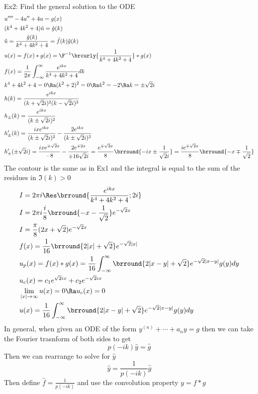 Ex2: Find the general solution to the ODE
\begin{align*}
    &u''''-4u''+4u=g(x)\\
    &(k^4+4k^2+4)\hat{u}=\hat{g}(k)\\
    &\hat{u}=\frac{\hat{g}(k)}{k^4+4k^2+4}=\hat{f}(k)\hat{g}(k)\\
    &u(x)=f(x)*g(x)=\F^{-1}\brcurly{\frac{1}{k^4+4k^2+4}}*g(x)\\
    &f(x)=\frac{1}{2\pi}\int_{-\infty}^\infty\frac{e^{ikx}}{k^4+4k^2+4}dk\\
    &k^4+4k^2+4=0\Ra (k^2+2)^2=0\Ra k^2=-2\Ra k=\pm \sqrt{2}i\\
    &h(k)=\frac{e^{ikx}}{(k+\sqrt{2}i)^2(k-\sqrt{2}i)^2}\\
    &h_\pm(k)=\frac{e^{ikx}}{(k\pm \sqrt{2}i)^2}\\
    &h_\pm'(k)=\frac{ixe^{ikx}}{(k\pm \sqrt{2}i)^2}-\frac{2e^{ikx}}{(k\pm \sqrt{2}i)^3}\\
    &h_\pm'(\pm \sqrt{2}i)=\frac{ixe^{\mp \sqrt{2}x}}{-8}-\frac{2e^{\mp 2x}}{\mp16\sqrt{2}i}=\frac{e^{\mp \sqrt{2}x}}{8}\brround{-ix\pm \frac{1}{\sqrt{2}i}}=\frac{ie^{\mp\sqrt{2}x}}{8}\brround{-x\mp\frac{1}{\sqrt{2}}}
\end{align*}
The contour is the same as in Ex1 and the integral is equal to the sum of the residues in $\Im(k)>0$
\begin{align*}
    &I=2\pi i\Res\brround{\frac{e^{ikx}}{k^4+4k^2+4};2i}\\
    &I=2\pi i\frac{i}{8}\brround{-x-\frac{1}{\sqrt{2}}}e^{-\sqrt{2}x}\\
    &I=\frac{\pi}{8}(2x+\sqrt{2})e^{-\sqrt{2}x}\\
    &f(x)=\frac{1}{16}\brround{2|x|+\sqrt{2}}e^{-\sqrt{2}|x|}\\
    &u_p(x)=f(x)*g(x)=\frac{1}{16}\int_{-\infty}^\infty\brround{2|x-y|+\sqrt{2}}e^{-\sqrt{2}|x-y|}g(y)dy\\
    &u_c(x)=c_1e^{\sqrt{2}ix}+c_2e^{-\sqrt{2}ix}\\
    &\lim_{|x|\to\infty} u(x)=0\Ra u_c(x)=0\\
    &u(x)=\frac{1}{16}\int_{-\infty}^\infty\brround{2|x-y|+\sqrt{2}}e^{-\sqrt{2}|x-y|}g(y)dy
\end{align*}
In general, when given an ODE of the form $y^{(n)}+\cdots+a_ny=g$ then we can take the Fourier trasnform of both sides to get
\[p(-ik)\hat{y}=\hat{g}\]
Then we can rearrange to solve for $\hat{y}$
\[\hat{y}=\frac{1}{p(-ik)}\hat{g}\]
Then define $\hat{f}=\frac{1}{p(-ik)}$ and use the convolution property $y=f * g$
